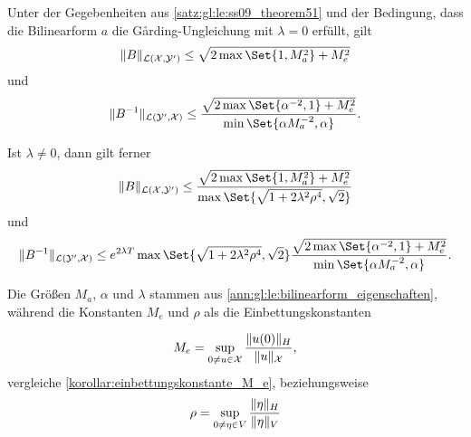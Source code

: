 \begin{Korollar}
\label{kor:gl:le:ss09_theorem51_ungleichungen}
    Unter der Gegebenheiten aus \cref{satz:gl:le:ss09_theorem51} und der Bedingung, dass die Bilinearform $a$ die G\aa{}rding-Ungleichung mit $\lambda = 0$ erfüllt, gilt
    \begin{equation}
        \norm{B}_{\mathcal L(\mathcal X, \mathcal Y')} \leq \sqrt{2 \max\Set{1, M_{a}^{2}} + M_{e}^{2}}
    \end{equation}
    und
    \begin{equation}
        \norm{B^{-1}}_{\mathcal L(\mathcal Y', \mathcal X)} \leq \frac{\sqrt{2 \max \Set{\alpha^{-2}, 1} + M_{e}^{2}}}{\min\Set{\alpha M_{a}^{-2}, \alpha}}.
    \end{equation}

    Ist $\lambda \neq 0$, dann gilt ferner
    \begin{equation}
        \label{kor:gl:le:norm_B_abschaetzung}
        \norm{B}_{\mathcal L(\mathcal X, \mathcal Y')} \leq \frac{\sqrt{2\max\Set{1, M_{a}^{2}} + M_{e}^{2}}}{\max\Set{\sqrt{1 + 2 \lambda^{2} \rho^{4}}, \sqrt{2}}}
    \end{equation}
    und
    \begin{equation}
        \label{kor:gl:le:norm_B_inv_abschaetzung}
        \norm{B^{-1}}_{\mathcal L(\mathcal Y', \mathcal X)} \leq e^{2 \lambda T} \max\Set{\sqrt{1 + 2 \lambda^{2} \rho^{4}}, \sqrt{2}}  \frac{\sqrt{2 \max\Set{ \alpha^{-2}, 1} + M_{e}^{2}}}{\min\Set{\alpha M_{a}^{-2}, \alpha}}.
    \end{equation}

    Die Größen $M_{a}$, $\alpha$ und $\lambda$ stammen aus \cref{ann:gl:le:bilinearform_eigenschaften},
    während die Konstanten $M_{e}$ und $\rho$ als die Einbettungskonstanten

    \begin{equation}
        \label{kor:gl:le:einbettungskonstante_M_e}
        M_{e} = \sup_{0 \neq u \in \mathcal X} \frac{\lVert u(0)\rVert_{H}}{\lVert u\rVert_{\mathcal X}},
    \end{equation}
    vergleiche \cref{korollar:einbettungskonstante_M_e}, beziehungsweise
    \begin{equation}
        \label{kor:gl:le:einbettungskonstante_rho}
        \rho = \sup_{0 \neq \eta \in V} \frac{\lVert\eta\rVert_{H}}{\lVert\eta\rVert_{V}}
    \end{equation}

    \begin{Beweis}
        $\,$\newline
    \end{Beweis}
\end{Korollar}

